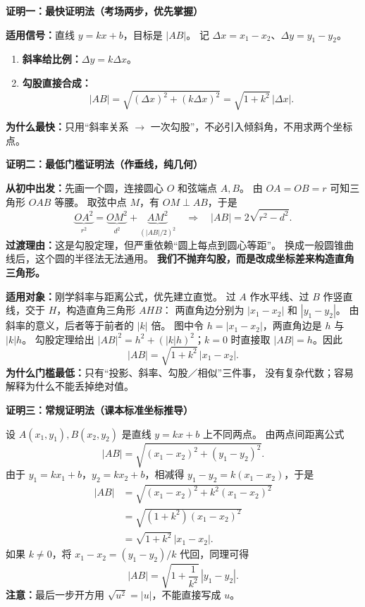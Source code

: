 \clearpage
\begin{proofbox}
\textbf{\textcolor{CProof}{证明一：最快证明法（考场两步，优先掌握）}}

\textbf{适用信号：}直线 $y=kx+b$，目标是 $|AB|$。
记 $\Delta x=x_1-x_2$、$\Delta y=y_1-y_2$。


\begin{enumerate}[leftmargin=*,itemsep=0.25em]
 \item \textbf{斜率给比例：}$\Delta y=k\Delta x$。
 \item \textbf{勾股直接合成：}
 \[
 |AB|=\sqrt{(\Delta x)^2+(k\Delta x)^2}
      =\boxed{\sqrt{1+k^2}\,|\Delta x|}.
 \]
\end{enumerate}
\textbf{为什么最快：}只用“斜率关系 $\rightarrow$ 一次勾股”，不必引入倾斜角，不用求两个坐标点。

\end{proofbox}
\clearpage
\begin{proofbox}
\textbf{\textcolor{CProof}{证明二：最低门槛证明法（作垂线，纯几何）}}



\textbf{从初中出发：}先画一个圆，连接圆心 $O$ 和弦端点 $A,B$。
由 $OA=OB=r$ 可知三角形 $OAB$ 等腰。
取弦中点 $M$，有 $OM\perp AB$，于是
\[
 \underbrace{OA^2}_{r^2}=\underbrace{OM^2}_{d^2}
 +\underbrace{AM^2}_{(|AB|/2)^2}
 \quad\Longrightarrow\quad
 |AB|=2\sqrt{r^2-d^2}.
\]
\textbf{过渡理由：}这是勾股定理，但严重依赖“圆上每点到圆心等距”。
换成一般圆锥曲线后，这个圆的半径法无法通用。
\textbf{我们不抛弃勾股，而是改成坐标差来构造直角三角形。}

\textbf{适用对象：}刚学斜率与距离公式，优先建立直觉。
过 $A$ 作水平线、过 $B$ 作竖直线，交于 $H$，构造直角三角形 $AHB$：
两直角边分别为 $|x_1-x_2|$ 和 $|y_1-y_2|$。
由斜率的意义，后者等于前者的 $|k|$ 倍。
图中令 $h=|x_1-x_2|$，两直角边是 $h$ 与 $|k|h$。
勾股定理给出 $|AB|^2=h^2+(|k|h)^2$；$k=0$ 时直接取 $|AB|=h$。因此
\[
 \boxed{|AB|=\sqrt{1+k^2}\,|x_1-x_2|}.
\]
\textbf{为什么门槛最低：}只有“投影、斜率、勾股／相似”三件事，
没有复杂代数；容易解释为什么不能丢掉绝对值。

\end{proofbox}
\clearpage
\begin{proofbox}
\textbf{\textcolor{CProof}{证明三：常规证明法（课本标准坐标推导）}}



设 $A(x_1,y_1),B(x_2,y_2)$ 是直线 $y=kx+b$ 上不同两点。
由两点间距离公式
\[
 |AB|=\sqrt{(x_1-x_2)^2+(y_1-y_2)^2}.
\]
由于 $y_1=kx_1+b$，$y_2=kx_2+b$，相减得
$y_1-y_2=k(x_1-x_2)$，于是
\[
 \begin{aligned}
 |AB|&=\sqrt{(x_1-x_2)^2+k^2(x_1-x_2)^2}\\
     &=\sqrt{(1+k^2)(x_1-x_2)^2}\\
     &=\boxed{\sqrt{1+k^2}\,|x_1-x_2|}.
 \end{aligned}
\]
如果 $k\ne0$，将 $x_1-x_2=(y_1-y_2)/k$ 代回，同理可得
\[
 \boxed{|AB|=\sqrt{1+\frac1{k^2}}\,|y_1-y_2|}.
\]
\textbf{注意：}最后一步开方用 $\sqrt{u^2}=|u|$，不能直接写成 $u$。

\end{proofbox}
